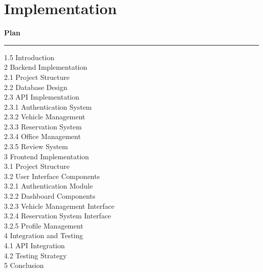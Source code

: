 \chapter{Implementation}

\noindent\textbf{\LARGE Plan}
\begin{center}
    \rule[0.5ex]{1\columnwidth}{1pt}
\end{center}

\begin{spacing}{1.5}
\normalsize
{} Introduction \\
2 Backend Implementation \\
\hspace*{0.5cm}2.1 Project Structure \\
\hspace*{0.5cm}2.2 Database Design \\
\hspace*{0.5cm}2.3 API Implementation \\
\hspace*{1cm}2.3.1 Authentication System \\
\hspace*{1cm}2.3.2 Vehicle Management \\
\hspace*{1cm}2.3.3 Reservation System \\
\hspace*{1cm}2.3.4 Office Management \\
\hspace*{1cm}2.3.5 Review System \\
3 Frontend Implementation \\
\hspace*{0.5cm}3.1 Project Structure \\
\hspace*{0.5cm}3.2 User Interface Components \\
\hspace*{1cm}3.2.1 Authentication Module \\
\hspace*{1cm}3.2.2 Dashboard Components \\
\hspace*{1cm}3.2.3 Vehicle Management Interface \\
\hspace*{1cm}3.2.4 Reservation System Interface \\
\hspace*{1cm}3.2.5 Profile Management \\
4 Integration and Testing \\
\hspace*{0.5cm}4.1 API Integration \\
\hspace*{0.5cm}4.2 Testing Strategy \\
5 Conclusion 
\end{spacing}

